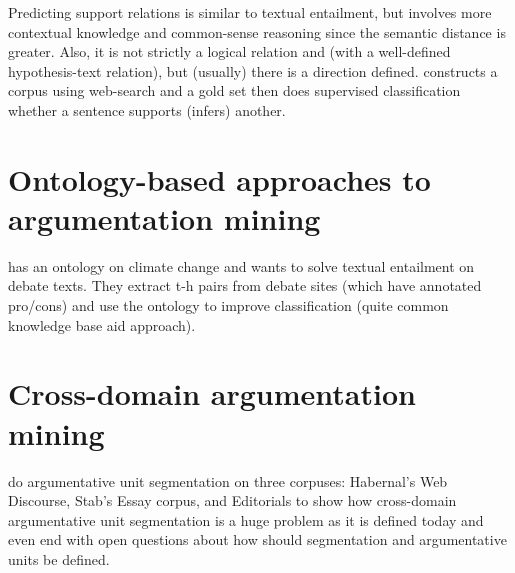 \documentclass[a4paper,10pt]{article}
\begin{document}
Predicting support relations is similar to textual entailment, but
involves more contextual knowledge and common-sense reasoning since the
semantic distance is greater. Also, it is not strictly a logical relation
and (with a well-defined hypothesis-text relation), but (usually) there
is a direction defined.
\cite{Lawrence2017} constructs a corpus using web-search and a gold set
then does supervised classification whether a sentence supports (infers)
another. 

\section{Ontology-based approaches to argumentation mining}

\cite{Szabo2018} has an ontology on climate change and wants to solve 
textual entailment on debate texts. 
They extract t-h pairs from debate sites (which have annotated pro/cons)
and use the ontology to improve classification (quite common knowledge
base aid approach). 

\section{Cross-domain argumentation mining}

\cite{Ajjour2017} do argumentative unit segmentation on three corpuses:
Habernal's Web Discourse, Stab's Essay corpus, and Editorials to show
how cross-domain argumentative unit segmentation is a huge problem as it
is defined today and even end with open questions about how should
segmentation and argumentative units be defined. 



\end{document}
